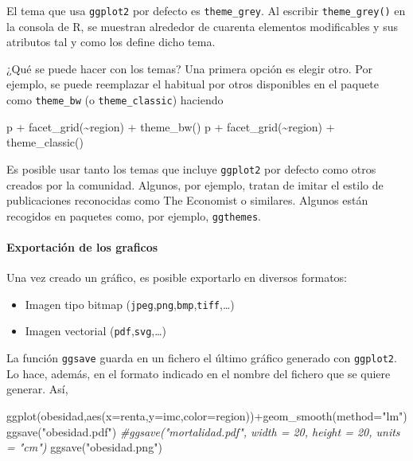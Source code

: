\documentclass[
]{article}
\newenvironment{Shaded}{\begin{snugshade}}{\end{snugshade}}
\newcommand{\AttributeTok}[1]{\textcolor[rgb]{0.77,0.63,0.00}{#1}}
\newcommand{\CommentTok}[1]{\textcolor[rgb]{0.56,0.35,0.01}{\textit{#1}}}
\newcommand{\FunctionTok}[1]{\textcolor[rgb]{0.00,0.00,0.00}{#1}}
\newcommand{\NormalTok}[1]{#1}
\newcommand{\SpecialCharTok}[1]{\textcolor[rgb]{0.00,0.00,0.00}{#1}}
\newcommand{\StringTok}[1]{\textcolor[rgb]{0.31,0.60,0.02}{#1}}
\providecommand{\tightlist}{%
  \setlength{\itemsep}{0pt}\setlength{\parskip}{0pt}}
\numberwithin{ejcnt}{section}
\begin{document}
El tema que usa \texttt{ggplot2} por defecto es \texttt{theme\_grey}. Al escribir \texttt{theme\_grey()} en la consola de R, se muestran alrededor de cuarenta elementos modificables y sus atributos tal y como los define dicho tema.

¿Qué se puede hacer con los temas? Una primera opción es elegir otro. Por ejemplo, se puede reemplazar el habitual por otros disponibles en el paquete como \texttt{theme\_bw} (o \texttt{theme\_classic}) haciendo

\begin{Shaded}
\begin{Highlighting}[]
\NormalTok{p }\SpecialCharTok{+} \FunctionTok{facet\_grid}\NormalTok{(}\SpecialCharTok{\textasciitilde{}}\NormalTok{region) }\SpecialCharTok{+} \FunctionTok{theme\_bw}\NormalTok{()}
\NormalTok{p }\SpecialCharTok{+} \FunctionTok{facet\_grid}\NormalTok{(}\SpecialCharTok{\textasciitilde{}}\NormalTok{region) }\SpecialCharTok{+} \FunctionTok{theme\_classic}\NormalTok{()}
\end{Highlighting}
\end{Shaded}

Es posible usar tanto los temas que incluye \texttt{ggplot2} por defecto como otros creados por la comunidad. Algunos, por ejemplo, tratan de imitar el estilo de publicaciones reconocidas como The Economist o similares. Algunos están recogidos en paquetes como, por ejemplo, \texttt{ggthemes}.

\hypertarget{exportaciuxf3n-de-los-graficos}{%
\paragraph{Exportación de los graficos}\label{exportaciuxf3n-de-los-graficos}}

Una vez creado un gráfico, es posible exportarlo en diversos formatos:

\begin{itemize}
\tightlist
\item
  Imagen tipo bitmap (\texttt{jpeg},\texttt{png},\texttt{bmp},\texttt{tiff},\ldots)
\item
  Imagen vectorial (\texttt{pdf},\texttt{svg},\ldots)
\end{itemize}

La función \texttt{ggsave} guarda en un fichero el último gráfico generado con \texttt{ggplot2}. Lo hace, además, en el formato indicado en el nombre del fichero que se quiere generar. Así,

\begin{Shaded}
\begin{Highlighting}[]
\FunctionTok{ggplot}\NormalTok{(obesidad,}\FunctionTok{aes}\NormalTok{(}\AttributeTok{x=}\NormalTok{renta,}\AttributeTok{y=}\NormalTok{imc,}\AttributeTok{color=}\NormalTok{region))}\SpecialCharTok{+}\FunctionTok{geom\_smooth}\NormalTok{(}\AttributeTok{method=}\StringTok{"lm"}\NormalTok{)}
\FunctionTok{ggsave}\NormalTok{(}\StringTok{"obesidad.pdf"}\NormalTok{)}
\CommentTok{\#ggsave("mortalidad.pdf", width = 20, height = 20, units = "cm")}
\FunctionTok{ggsave}\NormalTok{(}\StringTok{"obesidad.png"}\NormalTok{)}
\end{Highlighting}
\end{Shaded}
\end{document}
